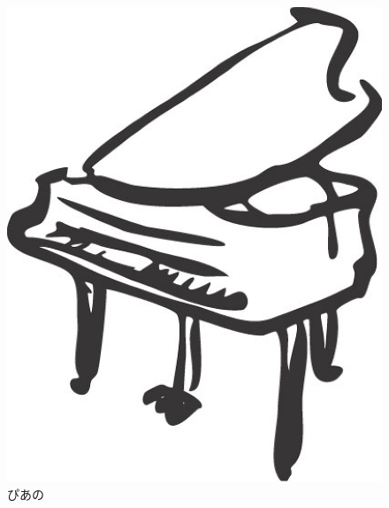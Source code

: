 \begin{figure}[htb]
  \begin{center}
    \includegraphics{./figure/piano.eps}
  \end{center}
  \caption{ぴあの}
  \label{fig:one}
\end{figure}
